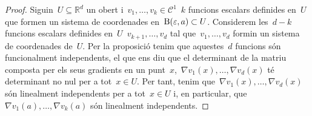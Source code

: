 \documentclass[../../main.tex]{subfiles}
\begin{document}
    \begin{proof}
        Siguin~\(U\subseteq\mathbb{R}^{d}\) un obert i~\(v_{1},\dots,v_{k}\in\mathcal{C}^{1}\)~\(k\) funcions escalars definides en~\(U\) que formen un sistema de coordenades en~\(\operatorname{B}(\varepsilon,a)\subset U\).
        Considerem les~\(d-k\) funcions escalars definides en~\(U\)~\(v_{k+1},\dots,v_{d}\) tal que~\(v_{1},\dots,v_{d}\) formin un sistema de coordenades de~\(U\).
        Per la proposició  tenim que aquestes~\(d\) funcions són funcionalment independents, el que ens diu que el determinant de la matriu composta per els seus gradients en un punt~\(x\),~\(\nabla v_{1}(x),\dots,\nabla v_{d}(x)\) té determinant no nul per a tot~\(x\in U\).
        Per tant, tenim que~\(\nabla v_{1}(x),\dots,\nabla v_{d}(x)\) són linealment independents per a tot~\(x\in U\) i, en particular, que~\(\nabla v_{1}(a),\dots,\nabla v_{k}(a)\) són linealment independents.
    \end{proof}
\end{document}
